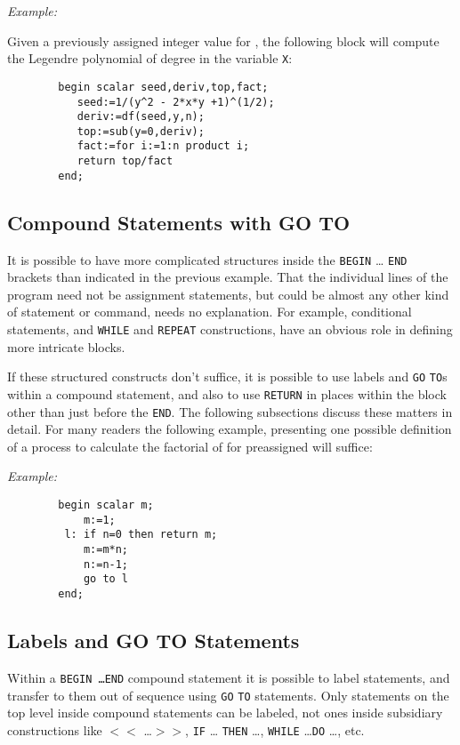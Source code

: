 \textit{Example:}

Given a previously assigned integer value for , the following block
will compute the Legendre polynomial of degree  in the variable
\texttt{X}:
\begin{verbatim}
        begin scalar seed,deriv,top,fact;
           seed:=1/(y^2 - 2*x*y +1)^(1/2);
           deriv:=df(seed,y,n);
           top:=sub(y=0,deriv);
           fact:=for i:=1:n product i;
           return top/fact
        end;
\end{verbatim}

\subsection{Compound Statements with GO TO}

It is possible to have more complicated structures inside the \texttt{BEGIN}
\ldots{} \texttt{END} brackets than indicated in the
previous example.  That the individual lines of the program need not be
assignment statements, but could be almost any other
kind of statement or command, needs no explanation.  For example,
conditional statements, and \texttt{WHILE} and \texttt{REPEAT}
 constructions, have an obvious role in defining more
intricate blocks.

If these structured constructs don't suffice, it is possible to use labels
 and \texttt{GO} \texttt{TO}s within a compound
statement, and also to use \texttt{RETURN}
 in places within the block other than just before the
\texttt{END}.  The following subsections discuss these matters in detail.
For many readers the following example, presenting one possible definition
of a process to calculate the factorial of  for preassigned 
will suffice:

\textit{Example:}
\begin{verbatim}
        begin scalar m;
            m:=1;
         l: if n=0 then return m;
            m:=m*n;
            n:=n-1;
            go to l
        end;
\end{verbatim}

\subsection{Labels and GO TO Statements}
\hypertarget{command:GOTO}{}

Within a \texttt{BEGIN \ldots END} compound
statement it is possible to label statements, and transfer to them out of
sequence using \texttt{GO} \texttt{TO} statements.  Only statements on the top
level inside compound statements can be labeled, not ones inside
subsidiary constructions like \texttt{$<<$} \ldots \texttt{$>>$}, \texttt{IF} \ldots
\texttt{THEN} \ldots , \texttt{WHILE} \ldots \texttt{DO} \ldots , etc.

